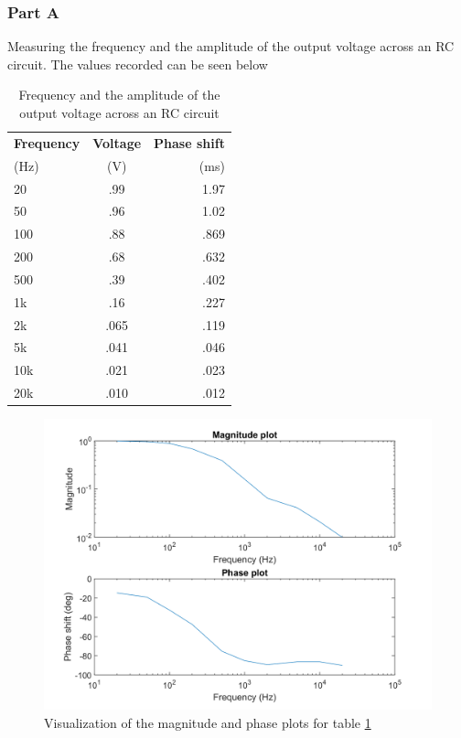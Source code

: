 \documentclass[10pt]{article}
\begin{document}
\subsubsection{Part A}
	Measuring the frequency and the amplitude of the output voltage across an RC circuit. The values recorded can be seen below
\begin{table}[H]
\begin{center}
	\caption{Frequency and the amplitude of the output voltage across an RC circuit}
	\label{tab: 32A}
	   \begin{tabular}{l|c|r}
		\textbf{Frequency} & \textbf{Voltage} & \textbf{Phase shift}\\
		(Hz) & (V) & (ms) \\
		\hline
		20 & .99 & 1.97\\
		50 & .96 & 1.02\\
		100 & .88 & .869\\
		200 & .68 & .632\\
		500 & .39 & .402\\
		1k & .16 & .227\\
		2k & .065 & .119\\
		5k & .041 & .046\\
		10k & .021 & .023\\
		20k & .010 & .012\\
	\end{tabular}
\end{center}
\end{table}
\begin{center}
	\begin{figure} [H]
		\centering
		\includegraphics[scale=0.4]{images/ourRC.png}
		\caption{Visualization of the magnitude and phase plots for table \ref{tab: 32A}}
		\label{fig:32A5}
	\end{figure}
\end{center}
\end{document}
